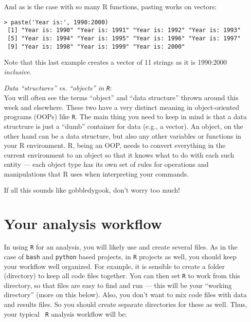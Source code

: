 And as is the case with so many R functions, pasting works on vectors:
\begin{lstlisting}
> paste('Year is:', 1990:2000)
 [1] "Year is: 1990" "Year is: 1991" "Year is: 1992" "Year is: 1993"
 [5] "Year is: 1994" "Year is: 1995" "Year is: 1996" "Year is: 1997"
 [9] "Year is: 1998" "Year is: 1999" "Year is: 2000"
\end{lstlisting}

Note that this last example creates a vector of 11 strings as it is 
1990:2000 {\it inclusive}. 

\begin{tipbox}
{\it Data ``structures'' vs. ``objects'' in {\tt R}}:\\

You will often see the terms ``object'' and ``data structure'' thrown 
around this week and elsewhere. These two have a very distinct meaning 
in object-oriented programs (OOPs) like {\tt R}. The main thing you 
need to keep in mind is that a data structrure is just a ``dumb'' 
container for data (e.g., a vector). An object, on the other hand can 
be a data structure, but also any other variables or functions in your R 
environment. R, being an OOP, needs to convert everything in the 
current environment to an object so that it knows what to do with each 
such entity --- each object type has its own set of rules for operations and 
manipulations that R uses when interpreting your commands. 

If all this sounds like gobbledygook, don't worry too much!      
	
\end{tipbox}

\section{Your analysis workflow}

In using {\tt R} for an analysis, you will likely use and create 
several files. As in the case of {\tt bash} and {\tt python} based 
projects, in {\tt R} projects as well, you should keep your workflow 
well organized. For example, it is sensible to create a folder 
(directory) to keep all code files together. You can then set {\tt R} 
to work from this directory, so that files are easy to find and run --- 
this will be your ``working directory'' (more on this below). Also, you 
don't want to mix code files with data and results files. So you should 
create separate directories for these as well. Thus, your typical {\tt 
R} analysis workflow will be:

